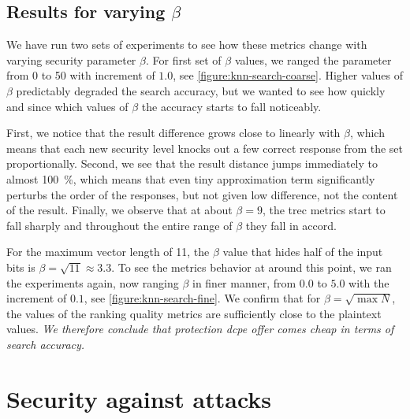 			\subsection{Results for varying $\beta$}

				

				We have run two sets of experiments to see how these metrics change with varying security parameter $\beta$.
				For first set of $\beta$ values, we ranged the parameter from 0 to 50 with increment of $1.0$, see \cref{figure:knn-search-coarse}.
				Higher values of $\beta$ predictably degraded the search accuracy, but we wanted to see how quickly and since which values of $\beta$ the accuracy starts to fall noticeably.

				First, we notice that the result difference grows close to linearly with $\beta$, which means that each new security level knocks out a few correct response from the set proportionally.
				Second, we see that the result distance jumps immediately to almost \SI{100}{\percent}, which means that even tiny approximation term significantly perturbs the order of the responses, but not given low difference, not the content of the result.
				Finally, we observe that at about $\beta = 9$, the \acrshort{trec} metrics start to fall sharply and throughout the entire range of $\beta$ they fall in accord.

				For the maximum vector length of 11, the $\beta$ value that hides half of the input bits is $\beta = \sqrt{11} \approx 3.3$.
				To see the metrics behavior at around this point, we ran the experiments again, now ranging $\beta$ in finer manner, from $0.0$ to $5.0$ with the increment of $0.1$, see \cref{figure:knn-search-fine}.
				We confirm that for $\beta = \sqrt{\max N}$, the values of the ranking quality metrics are sufficiently close to the plaintext values.
				\emph{We therefore conclude that protection \acrshort{dcpe} offer comes cheap in terms of search accuracy.}

				

	\section{Security against attacks}\label{section:knn-snapshot:attacks}

